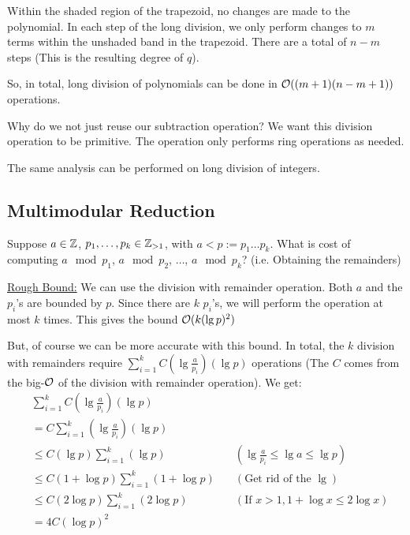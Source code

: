 Within the shaded region of the trapezoid, no changes are made to the polynomial.
In each step of the long division, we only perform changes to $m$ terms within the unshaded band in the trapezoid.
There are a total of $n-m$ steps (This is the resulting degree of $q$).

So, in total, long division of polynomials can be done in $\operatorname{\mathcal{O}}((m+1)(n-m+1))$ operations.

\begin{note}
    Why do we not just reuse our subtraction operation? We want this division operation to be primitive. The operation only performs ring operations as needed.
\end{note}

The same analysis can be performed on long division of integers.

\subsection{Multimodular Reduction}\label{sec:lec2-multimodular-reduction}
Suppose $a \in \operatorname{\mathbb{Z}}$, $p_1, \ldots, p_k \in \operatorname{\mathbb{Z}}_{> 1}$, with $a < p := p_1\ldots p_k$. What is cost of computing $a \mod p_1$, $a \mod p_2$, $\ldots$, $a \mod p_k$? (i.e. Obtaining the remainders)

\ul{Rough Bound:} We can use the division with remainder operation.
Both $a$ and the $p_i$'s are bounded by $p$.
Since there are $k$ $p_i$'s, we will perform the operation at most $k$ times.
This gives the bound $\operatorname{\mathcal{O}}(k(\lg p)^2)$

But, of course we can be more accurate with this bound.
In total, the $k$ division with remainders require $\sum_{i = 1}^k C\left(\lg \frac{a}{p_i}\right)\left(\lg p\right)$ operations (The $C$ comes from the big-$\operatorname{\mathcal{O}}$ of the division with remainder operation).
We get:
\begin{equation*}
\begin{aligned}
    &\sum_{i = 1}^k C\left(\lg \frac{a}{p_i}\right)\left(\lg p\right)\\
    &= C \sum_{i = 1}^k \left(\lg \frac{a}{p_i}\right)\left(\lg p\right) \\
    &\leq C \left(\lg p\right) \sum_{i = 1}^k \left(\lg p\right) \quad &(\lg \frac{a}{p_i} \leq \lg a \leq \lg p) \\
    &\leq C (1 + \log p) \sum_{i = 1}^k (1 + \log p) \quad & (\text{Get rid of the }\lg)\\
    &\leq C (2\log p) \sum_{i = 1}^k (2\log p) \quad & (\text{If } x > 1, 1 + \log x \leq 2\log x)\\
    &=4C(\log p)^2
\end{aligned}
\end{equation*}
